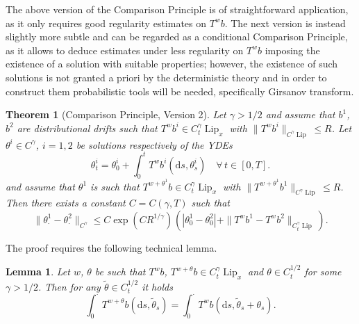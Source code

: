 \documentclass[10pt]{article}
\newcommand{\mathd}{\mathrm{d}}
\newcommand{\tmop}[1]{\ensuremath{\operatorname{#1}}}
\newtheorem{lemma}{Lemma}
\newtheorem{theorem}{Theorem}
\begin{document}
The above version of the Comparison Principle is of straightforward
application, as it only requires good regularity estimates on $T^w b$. The
next version is instead slightly more subtle and can be regarded as a
conditional Comparison Principle, as it allows to deduce estimates under less
regularity on $T^w b$ imposing the existence of a solution with suitable
properties; however, the existence of such solutions is not granted a priori
by the deterministic theory and in order to construct them probabilistic tools
will be needed, specifically Girsanov transform.

\begin{theorem}[Comparison Principle, Version 2]
  \label{sec4.1 comparison thm v2}Let $\gamma > 1 / 2$ and assume that $b^1$,
  $b^2$ are distributional drifts such that $T^w b^i \in C^{\gamma}_t
  \tmop{Lip}_x$ with $\| T^w b^i \|_{C^{\gamma} \tmop{Lip}} \leqslant R$. Let
  $\theta^i \in C^{\gamma}$, $i = 1, 2$ be solutions respectively of the YDEs
  \[ \theta_t^i = \theta_0^i + \int_0^t T^w b^i (\mathd s, \theta^i_s)  \quad
     \forall \, t \in [0, T] . \]
  and assume that $\theta^1$ is such that $T^{w + \theta^1} b \in C^{\gamma}_t
  \tmop{Lip}_x$ with $\| T^{w + \theta^1} b^1 \|_{C^{\gamma} \tmop{Lip}}
  \leqslant R$. Then there exists a constant $C = C (\gamma, T)$ such that
  \begin{equation}
    \| \theta^1_{\cdot} - \theta^2_{\cdot} \|_{C^{\gamma}} \leqslant C \exp (C
    R^{1 / \gamma})^{} (| \theta^1_0 - \theta^2_0 | + \| T^w b^1 - T^w b^2
    \|_{C^{\gamma}_t \tmop{Lip}}) . \label{sec4.1 comparison v2}
  \end{equation}
\end{theorem}

The proof requires the following technical lemma.

\begin{lemma}
  \label{sec4.1 technical lemma 2}Let $w$, $\theta$ be such that $T^w b$,
  $T^{w + \theta} b \in C^{\gamma}_t \tmop{Lip}_x$ and $\theta \in C^{1 /
  2}_t$ for some $\gamma > 1 / 2$. Then for any $\tilde{\theta} \in C^{1 /
  2}_t$ it holds
  \begin{equation}
    \int_0^{\cdot} T^{w + \theta} b (\mathd s, \tilde{\theta}_s) =
    \int_0^{\cdot} T^w b (\mathd s, \tilde{\theta}_s + \theta_s) .
    \label{sec4.1 eq techlem}
  \end{equation}
\end{lemma}
\end{document}
